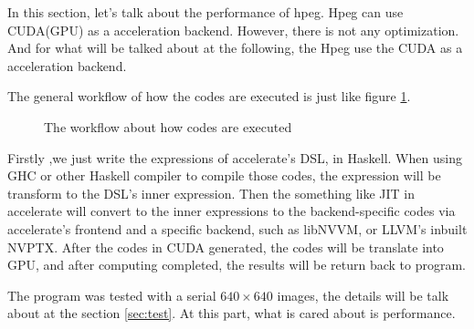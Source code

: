 \documentclass{article}
\begin{document}
In this section, let's talk about the performance of hpeg. Hpeg can use CUDA(GPU) as a
acceleration backend. However, there is not any optimization.
And for what will be talked about at the following, the Hpeg use the CUDA as a acceleration backend.

The general workflow of how the codes are executed is just like figure \ref{fig:code:workflow}.

\begin{figure}
    \centering
    \caption{The workflow about how codes are executed}
    \label{fig:code:workflow}
\end{figure}

Firstly ,we just write the expressions of accelerate's DSL, in Haskell.
When using GHC or other Haskell compiler to compile those codes, the expression will be transform to
the DSL's inner expression. Then the something like JIT in accelerate will convert to the inner
expressions to the backend-specific codes via accelerate's frontend and a specific backend,
such as libNVVM, or LLVM's inbuilt NVPTX. After the codes in CUDA generated,
the codes will be translate into GPU, and after computing completed,
the results will be return back to program.

The program was tested with a serial $640 \times 640$ images, the details will be talk about at the section \ref{sec:test}. At this part, what is cared about is performance.
\end{document}
